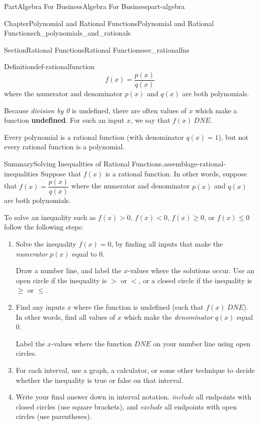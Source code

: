 \documentclass{tufte-book}
\newcommand{\terminology}[1]{\textbf{#1}}
\numberwithin{equation}{chapter}
\newcommand{\lt}{<}
\newcommand{\gt}{>}
\begin{document}
\begin{partptx}{Part}{Algebra For Business}{}{Algebra For Business}{}{}{part-algebra}
\begin{chapterptx}{Chapter}{Polynomial and Rational Functions}{}{Polynomial and Rational Functions}{}{}{ch_polynomials_and_rationals}
\begin{sectionptx}{Section}{Rational Functions}{}{Rational Functions}{}{}{sec_rationalfns}
\begin{definition}{Definition}{}{def-rationalfunction}
\begin{equation*}
f(x) = \dfrac{p(x)}{q(x)}
\end{equation*}
where the numerator and denominator \(p(x)\) and  \(q(x)\) are both polynomials.%
\par
Because \emph{division by 0} is undefined, there are often values of \(x\) which make a function \terminology{undefined}.  For such an input \(x\), we say that \(f(x)\ DNE\).%
\end{definition}
Every polynomial is a rational function (with denominator \(q(x)=1\)), but not every rational function is a polynomial.%
\begin{assemblage}{Summary}{Solving Inequalities of Rational Functions.}{assemblage-rational-inequalities}%
Suppose that \(f(x)\) is a rational function.  In other words, suppose that \(f(x) = \dfrac{p(x)}{q(x)}\) where the numerator and denominator \(p(x)\) and  \(q(x)\) are both polynomials.%
\par
To solve an inequality such as  \(f(x) \gt 0\), \(f(x) \lt 0\), \(f(x)\geq 0\), or \(f(x)\leq 0\) follow the following steps:%
\par
%
\begin{enumerate}
\item{}Solve the inequality \(f(x) = 0\), by finding all inputs that make the \emph{numerator} \(p(x)\) equal to \(0\).%
\par
Draw a number line, and label the \(x\)-values where the solutions occur. Use an open circle if the inequality is \(\gt\) or \(\lt\), or a closed circle if the inequality is \(\geq\) or \(\leq\).%
\item{}Find any inputs \(x\) where the function is undefined (such that \(f(x)\ DNE\)). In other words, find all values of \(x\) which make the \emph{denominator} \(q(x)\) equal \(0\).%
\par
Label the \(x\)-values where the function \(DNE\) on your number line using open circles.%
\item{}For each interval, use a graph, a calculator, or some other technique to decide whether the inequality is true or false on that interval.%
\item{}Write your final answer down in interval notation.  \emph{include} all endpoints with closed circles (use square brackets), and \emph{exclude} all endpoints with open circles (use parentheses).%
\end{enumerate}
%
\end{assemblage}
\end{sectionptx}
\end{chapterptx}

\end{partptx}
\end{document}
